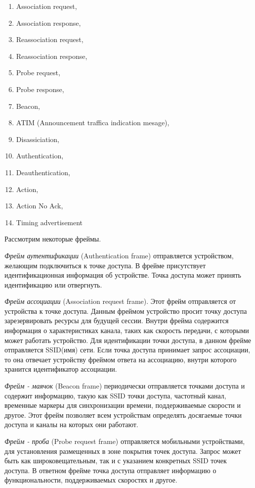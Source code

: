 \begin{enumerate}
	\item Association request,
	\item Association response,
	\item Reassociation request,
	\item Reassociation response,
	\item Probe request,
	\item Probe response,
	\item Beacon,
	\item ATIM (Announcement traffica indication mesage),
	\item Disassiciation,
	\item Authentication,
	\item Deauthentication,
	\item Action,
	\item Action No Ack,
	\item Timing advertisement
\end{enumerate}

Рассмотрим некоторые фреймы.

\textit{Фрейм аутентификации} (Authentication frame) отправляется устройством, желающим подключиться к точке доступа. В фрейме присутствует идентификационная информация об устройстве. Точка доступа может принять идентификацию или отвергнуть.

\textit{Фрейм ассоциации} (Association request frame). Этот фрейм отправляется от устройства к точке доступа. Данным фреймом устройство просит точку доступа зарезервировать ресурсы для будущей сессии. Внутри фрейма содержится информация о характеристиках канала, таких как скорость передачи, с которыми может работать устройство. Для идентификации точки доступа, в данном фрейме отправляется SSID(имя) сети. Если точка доступа принимает запрос ассоциации, то она отвечает устройству фреймом ответа на ассоциацию, внутри которого хранится идентификатор ассоциации.

\textit{Фрейм - маячок} (Beacon frame) периодически отправляется точками доступа и содержит информацию, такую как SSID точки доступа, частотный канал, временные маркеры для синхронизации времени, поддерживаемые скорости и другое. Этот фрейм позволяет всем устройствам определять досягаемые точки доступа и каналы на которых они работают.

\textit{Фрейм - проба} (Probe request frame) отправляется мобильными устройствами, для установления размещенных в зоне покрытия точек доступа. Запрос может быть как широковещательным, так и с указанием конкретных SSID точек доступа. В ответном фрейме точка доступа отправляет информацию о функциональности, поддерживаемых скоростях и другое.

